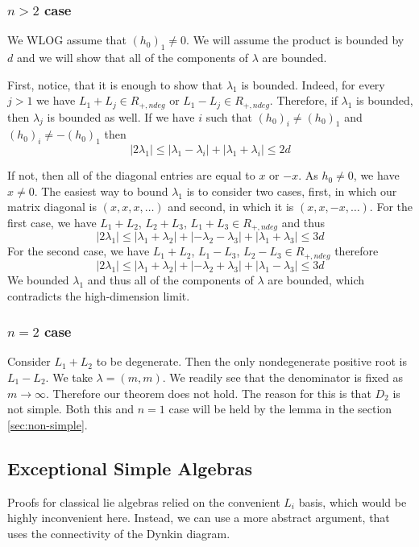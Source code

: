 \documentclass[11pt, a4paper]{article}
\theoremstyle{definition}
\theoremstyle{remark}
\begin{document}
\subsubsection*{$n>2$ case}
We WLOG assume that $(h_0)_1\neq0$. We will assume the product is bounded by $d$ and we will show that all of the components of $\lambda$ are bounded.  

First, notice, that it is enough to show that $\lambda_1$ is bounded. Indeed, for every $j>1$ we have $L_1+L_j\in R_{+,ndeg}$ or $L_1-L_j\in R_{+,ndeg}$. Therefore, if $\lambda_1$ is bounded, then $\lambda_j$ is bounded as well. If we have $i$ such that $(h_0)_i\neq(h_0)_1$ and $(h_0)_i\neq-(h_0)_1$ then $$
|2\lambda_1|\leq |\lambda_1-\lambda_i|+|\lambda_1+\lambda_i|\leq 2d
$$

If not, then all of the diagonal entries are equal to $x$ or $-x$. As $h_0\neq0$, we have $x\neq0$. The easiest way to bound $\lambda_1$ is to consider two cases, first, in which our matrix diagonal is $(x,x,x,\dots)$ and second, in which it is $(x,x,-x,\dots)$. For the first case, we have $L_1+L_2$, $L_2+L_3$, $L_1+L_3\in R_{+,ndeg}$ and thus $$
|2\lambda_1|\leq |\lambda_1+\lambda_2|+|-\lambda_2-\lambda_3|+|\lambda_1+\lambda_3| \leq 3d
$$
For the second case, we have $L_1+L_2$, $L_1-L_3$, $L_2-L_3\in R_{+,ndeg}$ therefore $$
|2\lambda_1|\leq |\lambda_1+\lambda_2|+|-\lambda_2+\lambda_3|+|\lambda_1-\lambda_3| \leq 3d
$$
We bounded $\lambda_1$ and thus all of the components of $\lambda$ are bounded, which contradicts the high-dimension limit.

\subsubsection*{$n=2$ case}

Consider $L_1+L_2$ to be degenerate. Then the only nondegenerate positive root is $L_1-L_2$. We take $\lambda = (m,m)$. We readily see that the denominator is fixed as $m\to\infty$. Therefore our theorem does not hold. The reason for this is that $D_2$ is not simple. Both this and $n=1$ case will be held by the lemma in the section \ref{sec:non-simple}.

\subsection{Exceptional Simple Algebras}
\label{sec:exceptional}

Proofs for classical lie algebras relied on the convenient $L_i$ basis, which would be highly inconvenient here. Instead, we can use a more abstract argument, that uses the connectivity of the Dynkin diagram.
\end{document}
